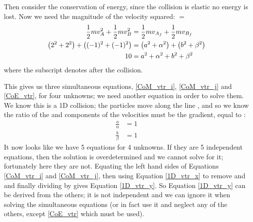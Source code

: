 \begin{problem}[A1988FMIVQ1a]
{\begin{enumerate}
Then consider the conservation of energy, since the collision is elastic no energy is lost. Now we need the magnitude of the velocity squared:  $=$ 
\begin{align} 
\frac{1}{2}mv_{A}^{2} + \frac{1}{2}mv_{B}^{2} &= \frac{1}{2}mv_{A_{f}} + \frac{1}{2}mv_{B_{f}} \notag \\ 
\left(2^{2} + 2^{2}\right) + \left((-1)^{2} + (-1)^{2}\right) &= \left(a^{2} + \alpha^{2}\right) + \left(b^{2} + \beta^{2}\right) \notag \\ 
10 &= a^{2} + \alpha^{2} + b^{2} + \beta^{2} \label{CoE_vtr} 
\end{align}
where the subscript  denotes after the collision.

This gives us three simultaneous equations, \eqref{CoM_vtr_i}, \eqref{CoM_vtr_j} and \eqref{CoE_vtr}, for four unknowns; we need another equation in order to solve them. We know this is a 1D collision; the particles move along the line , and so we know the ratio of the  and  components of the velocities must be the gradient, equal to : 
\begin{align} 
\frac{a}{\alpha} &= 1 \label{1D_vtr_x} \\ 
\frac{b}{\beta} &= 1 \label{1D_vtr_y} 
\end{align}
It now looks like we have 5 equations for 4 unknowns. If they are 5 independent equations, then the solution is overdetermined and we cannot solve for it; fortunately here they are not. Equating the left hand sides of Equations \eqref{CoM_vtr_i} and \eqref{CoM_vtr_j}, then using Equation \eqref{1D_vtr_x} to remove  and  and finally dividing by \vari{\beta} gives Equation \eqref{1D_vtr_y}. So Equation \eqref{1D_vtr_y} can be derived from the others; it is not independent and we can ignore it when solving the simultaneous equations (or in fact use it and neglect any of the others, except \eqref{CoE_vtr} which must be used).


\end{enumerate}}
\end{problem}

